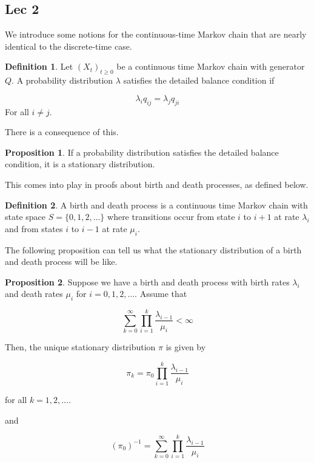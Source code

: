 \documentclass[12pt]{article}
\theoremstyle{definition}
\newtheorem{definition}{Definition}[section]
\newtheorem{proposition}{Proposition}[section]
\begin{document}
\subsection{Lec 2}

We introduce some notions for the continuous-time Markov chain that are nearly identical to the discrete-time case.

\begin{definition}
  Let $(X_t)_{t \geq 0}$ be a continuous time Markov chain with generator $Q$. A probability distribution $\lambda$ satisfies the detailed balance condition if

  $$
  \lambda_i q_{ij} = \lambda_j q_{ji}
  $$
  For all $i\ne j$.
\end{definition}

There is a consequence of this.

\begin{proposition}
  If a probability distribution satisfies the detailed balance condition, it is a stationary distribution.
\end{proposition}

This comes into play in proofs about birth and death processes, as defined below.

\begin{definition}
  A birth and death process is a continuous time Markov chain with state space $S = \{0 ,1, 2, \dots \}$ where transitions occur from state $i$ to $i+1$ at rate $\lambda_i$ and from states $i$ to $i -1$ at rate $\mu_i$.
\end{definition}

The following proposition can tell us what the stationary distribution of a birth and death process will be like.

\begin{proposition}
  Suppose we have a birth and death process with birth rates $\lambda_i$ and death rates $\mu_i$ for $i = 0,1,2, \dots$. Assume that

  $$
  \sum_{k =0}^{\infty} \prod_{i =1}^{k} \frac{\lambda_{i -1}}{\mu_i} < \infty
  $$

  Then, the unique stationary distribution $\pi$ is given by

  $$
  \pi_k = \pi_0 \prod_{i=1}^k \frac{\lambda_{i-1}}{\mu_i}
  $$

  for all $k = 1,2,\dots$.

  and

  $$
  (\pi_0)^{-1} = \sum_{k=0}^\infty \prod_{i=1}^k \frac{\lambda_{i-1}}{\mu_i}
  $$
\end{proposition}
\end{document}
